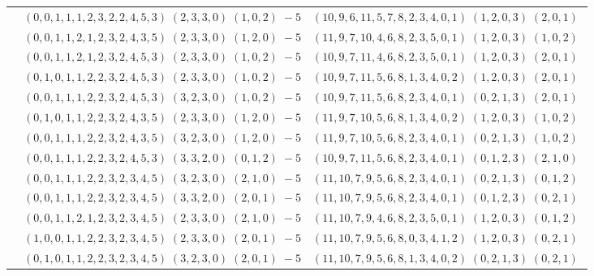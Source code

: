 \documentclass[11pt]{article}
\begin{document}
\begin{longtable}[l]{|c|c|c|}
 \cline{2-3} 
 & $(0 ,0 ,1 ,1 ,1 ,2 ,3 ,2 ,2 ,4 ,5 ,3) \;(2 ,3 ,3 ,0) \;(1 ,0 ,2) \;-5$ & $(10 ,9 ,6 ,11 ,5 ,7 ,8 ,2 ,3 ,4 ,0 ,1) \;(1 ,2 ,0 ,3) \;(2 ,0 ,1) \;$\\ 
 \cline{2-3} 
 & $(0 ,0 ,1 ,1 ,2 ,1 ,2 ,3 ,2 ,4 ,3 ,5) \;(2 ,3 ,3 ,0) \;(1 ,2 ,0) \;-5$ & $(11 ,9 ,7 ,10 ,4 ,6 ,8 ,2 ,3 ,5 ,0 ,1) \;(1 ,2 ,0 ,3) \;(1 ,0 ,2) \;$\\ 
 \cline{2-3} 
 & $(0 ,0 ,1 ,1 ,2 ,1 ,2 ,3 ,2 ,4 ,5 ,3) \;(2 ,3 ,3 ,0) \;(1 ,0 ,2) \;-5$ & $(10 ,9 ,7 ,11 ,4 ,6 ,8 ,2 ,3 ,5 ,0 ,1) \;(1 ,2 ,0 ,3) \;(2 ,0 ,1) \;$\\ 
 \cline{2-3} 
 & $(0 ,1 ,0 ,1 ,1 ,2 ,2 ,3 ,2 ,4 ,5 ,3) \;(2 ,3 ,3 ,0) \;(1 ,0 ,2) \;-5$ & $(10 ,9 ,7 ,11 ,5 ,6 ,8 ,1 ,3 ,4 ,0 ,2) \;(1 ,2 ,0 ,3) \;(2 ,0 ,1) \;$\\ 
 \cline{2-3} 
 & $(0 ,0 ,1 ,1 ,1 ,2 ,2 ,3 ,2 ,4 ,5 ,3) \;(3 ,2 ,3 ,0) \;(1 ,0 ,2) \;-5$ & $(10 ,9 ,7 ,11 ,5 ,6 ,8 ,2 ,3 ,4 ,0 ,1) \;(0 ,2 ,1 ,3) \;(2 ,0 ,1) \;$\\ 
 \cline{2-3} 
 & $(0 ,1 ,0 ,1 ,1 ,2 ,2 ,3 ,2 ,4 ,3 ,5) \;(2 ,3 ,3 ,0) \;(1 ,2 ,0) \;-5$ & $(11 ,9 ,7 ,10 ,5 ,6 ,8 ,1 ,3 ,4 ,0 ,2) \;(1 ,2 ,0 ,3) \;(1 ,0 ,2) \;$\\ 
 \cline{2-3} 
 & $(0 ,0 ,1 ,1 ,1 ,2 ,2 ,3 ,2 ,4 ,3 ,5) \;(3 ,2 ,3 ,0) \;(1 ,2 ,0) \;-5$ & $(11 ,9 ,7 ,10 ,5 ,6 ,8 ,2 ,3 ,4 ,0 ,1) \;(0 ,2 ,1 ,3) \;(1 ,0 ,2) \;$\\ 
 \cline{2-3} 
 & $(0 ,0 ,1 ,1 ,1 ,2 ,2 ,3 ,2 ,4 ,5 ,3) \;(3 ,3 ,2 ,0) \;(0 ,1 ,2) \;-5$ & $(10 ,9 ,7 ,11 ,5 ,6 ,8 ,2 ,3 ,4 ,0 ,1) \;(0 ,1 ,2 ,3) \;(2 ,1 ,0) \;$\\ 
 \cline{2-3} 
 & $(0 ,0 ,1 ,1 ,1 ,2 ,2 ,3 ,2 ,3 ,4 ,5) \;(3 ,2 ,3 ,0) \;(2 ,1 ,0) \;-5$ & $(11 ,10 ,7 ,9 ,5 ,6 ,8 ,2 ,3 ,4 ,0 ,1) \;(0 ,2 ,1 ,3) \;(0 ,1 ,2) \;$\\ 
 \cline{2-3} 
 & $(0 ,0 ,1 ,1 ,1 ,2 ,2 ,3 ,2 ,3 ,4 ,5) \;(3 ,3 ,2 ,0) \;(2 ,0 ,1) \;-5$ & $(11 ,10 ,7 ,9 ,5 ,6 ,8 ,2 ,3 ,4 ,0 ,1) \;(0 ,1 ,2 ,3) \;(0 ,2 ,1) \;$\\ 
 \cline{2-3} 
 & $(0 ,0 ,1 ,1 ,2 ,1 ,2 ,3 ,2 ,3 ,4 ,5) \;(2 ,3 ,3 ,0) \;(2 ,1 ,0) \;-5$ & $(11 ,10 ,7 ,9 ,4 ,6 ,8 ,2 ,3 ,5 ,0 ,1) \;(1 ,2 ,0 ,3) \;(0 ,1 ,2) \;$\\ 
 \cline{2-3} 
 & $(1 ,0 ,0 ,1 ,1 ,2 ,2 ,3 ,2 ,3 ,4 ,5) \;(2 ,3 ,3 ,0) \;(2 ,0 ,1) \;-5$ & $(11 ,10 ,7 ,9 ,5 ,6 ,8 ,0 ,3 ,4 ,1 ,2) \;(1 ,2 ,0 ,3) \;(0 ,2 ,1) \;$\\ 
 \cline{2-3} 
 & $(0 ,1 ,0 ,1 ,1 ,2 ,2 ,3 ,2 ,3 ,4 ,5) \;(3 ,2 ,3 ,0) \;(2 ,0 ,1) \;-5$ & $(11 ,10 ,7 ,9 ,5 ,6 ,8 ,1 ,3 ,4 ,0 ,2) \;(0 ,2 ,1 ,3) \;(0 ,2 ,1) \;$\\ 

\end{longtable}
\end{document}
